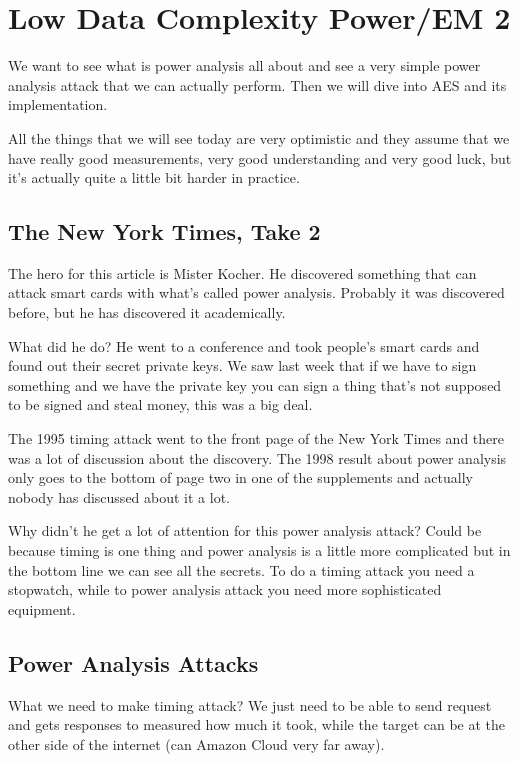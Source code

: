 \chapter{Low Data Complexity Power/EM 2}

We want to see what is power analysis all about and see a very simple power
analysis attack that we can actually perform. Then we will dive into AES and its
implementation.

All the things that we will see today are very optimistic and they assume that
we have really good measurements, very good understanding and very good luck,
but it's actually quite a little bit harder in practice.

\section{The New York Times, Take 2}
The hero for this article is Mister Kocher. He discovered something that can
attack smart cards with what's called power analysis. Probably it was discovered
before, but he has discovered it academically.

What did he do? He went to a conference and took people's smart cards and found
out their secret private keys. We saw last week that if we have to sign
something and we have the private key you can sign a thing that's not supposed
to be signed and steal money, this was a big deal.

The 1995 timing attack went to the front page of the New York Times and there
was a lot of discussion about the discovery. The 1998 result about power
analysis only goes to the bottom of page two in one of the supplements and
actually nobody has discussed about it a lot. 

Why didn't he get a lot of attention for this power analysis attack? Could be
because timing is one thing and power analysis is a little more complicated but
in the bottom line we can see all the secrets. To do a timing attack you need a
stopwatch, while to power analysis attack you need more sophisticated equipment.

\section{Power Analysis Attacks}
What we need to make timing attack? We just need to be able to send request and
gets responses to measured how much it took, while the target can be at the
other side of the internet (can Amazon Cloud very far away).

